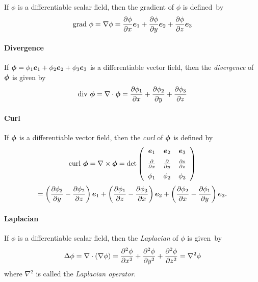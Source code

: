 \documentclass{31x47jw}
\begin{document}
If $\phi$ is a differentiable scalar field, then the gradient of $\phi$ is 
defined~by
\[
\mbox{grad}\ \phi = \nabla \phi = 
{\partial \phi\over \partial x}{\mbox{\boldmath $e$}}_{1} +
{\partial \phi\over \partial y}{\mbox{\boldmath $e$}}_{2} +
{\partial \phi\over \partial z}{\mbox{\boldmath $e$}}_{3} 
\]

\paragraph{Divergence}  

If ${\mbox{\boldmath $\phi$}} = \phi_{1}{\mbox{\boldmath $e$}}_{1} + \phi_{2}{\mbox{\boldmath $e$}}_{2} +
\phi_{3}{\mbox{\boldmath $e$}}_{3}$ is a differentiable vector field, then the
\emph{divergence} of ${\mbox{\boldmath $\phi$}}$ is given by
\[
\mbox{div}\ {\mbox{\boldmath $\phi$}} =
\nabla \cdot {\mbox{\boldmath $\phi$}} 
=
{\partial \phi_{1}\over \partial x} +
{\partial \phi_{2}\over \partial y} +
{\partial \phi_{3}\over \partial z} 
\]

\paragraph{Curl}

If ${\mbox{\boldmath $\phi$}}$ is a
differentiable vector field, then the \emph{curl} of ${\mbox{\boldmath $\phi$}}$ is defined by
\[
\mbox{curl}\ {\mbox{\boldmath $\phi$}} =
\nabla \times {\mbox{\boldmath $\phi$}} = \det {\left(\begin{array}{cccccccc}
{\mbox{\boldmath $e$}}_{1} & {\mbox{\boldmath $e$}}_{2} & {\mbox{\boldmath $e$}}_{3} \\[0.2cm]
{\partial \over \partial x} & {\partial \over \partial y} & {\partial 
o\over \partial z}\\[0.2cm]
\phi_{1} & \phi_{2} & \phi_{3}
\end{array}\right)}
\]
\[
= 
\left({\partial \phi_{3}\over \partial y} - {\partial \phi_{2}\over \partial z}\right){\mbox{\boldmath $e$}}_{1} + 
\left({\partial \phi_{1}\over \partial z} - {\partial \phi_{3}\over \partial x}\right){\mbox{\boldmath $e$}}_{2} + 
\left({\partial \phi_{2}\over \partial x} - {\partial \phi_{1}\over \partial y}\right){\mbox{\boldmath $e$}}_{3} .
\]

\paragraph{Laplacian}  

If $\phi$ is a differentiable scalar field, then the \emph{Laplacian} 
of $\phi$ is given~by
\[
\Delta \phi =
\nabla \cdot (\nabla \phi) = {\partial^{2} \phi\over \partial x^{2}} +
{\partial^{2} \phi\over \partial y^{2}} +
{\partial^{2} \phi\over \partial z^{2}}  = \nabla^{2} \phi
\]
where $\nabla^{2}$ is called the \emph{Laplacian operator}.
\end{document}
